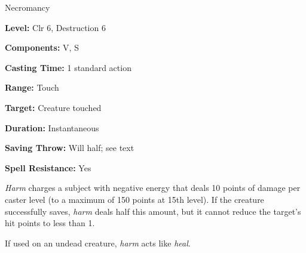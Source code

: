 
Necromancy

\textbf{Level:} Clr 6, Destruction 6

\textbf{Components:} V, S

\textbf{Casting Time:} 1 standard action

\textbf{Range:} Touch

\textbf{Target:} Creature touched

\textbf{Duration:} Instantaneous

\textbf{Saving Throw:} Will half; see text

\textbf{Spell Resistance:} Yes

\textit{Harm} charges a subject with negative energy that deals 10 points of damage 
per caster level (to a maximum of 150 points at 15th level). If the creature successfully 
saves, \textit{harm} deals half this amount, but it cannot reduce the target's 
hit points to less than 1.

If used on an undead creature, \textit{harm} acts like \textit{heal}.

